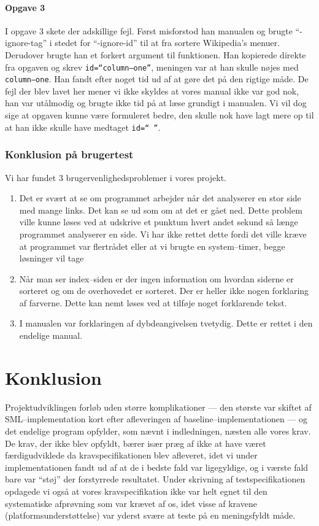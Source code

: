 \documentclass[a4paper,oneside]{memoir}
\begin{document}
\subsubsection{Opgave 3}
I opgave 3 skete der adskillige fejl. Først misforstod han manualen og
brugte ``-ignore-tag'' i stedet for ``-ignore-id'' til at fra sortere
Wikipedia's menuer. Derudover brugte han et forkert argument til
funktionen. Han kopierede direkte fra opgaven og skrev
\texttt{id=``column--one''}, meningen var at han skulle nøjes med
\texttt{column--one}. Han fandt efter noget tid ud af at gøre det på
den rigtige måde. De fejl der blev lavet her mener vi ikke skyldes at
vores manual ikke var god nok, han var utålmodig og brugte ikke tid på
at læse grundigt i manualen. Vi vil dog sige at opgaven kunne være
formuleret bedre, den skulle nok have lagt mere op til at han ikke
skulle have medtaget \texttt{id=`` ''}.

\subsection{Konklusion på brugertest}
Vi har fundet 3 brugervenlighedsproblemer i vores projekt.
\begin{enumerate}
\item Det er svært at se om programmet arbejder når det analyserer en
  stor side med mange links. Det kan se ud som om at det er gået
  ned. Dette problem ville kunne løses ved at udskrive et punktum
  hvert andet sekund så længe programmet analyserer en side. Vi har
  ikke rettet dette fordi det ville kræve at programmet var flertrådet
  eller at vi brugte en system--timer, begge løsninger vil tage
\item Når man ser index--siden er der ingen information om hvordan
  siderne er sorteret og om de overhovedet er sorteret. Der er heller
  ikke nogen forklaring af farverne. Dette kan nemt løses ved at
  tilføje noget forklarende tekst.
\item I manualen var forklaringen af dybdeangivelsen tvetydig. Dette
  er rettet i den endelige manual.
\end{enumerate}

\chapter{Konklusion}
\label{konklusion}

Projektudviklingen forløb uden større komplikationer --- den største
var skiftet af SML--implementation kort efter afleveringen af
baseline--implementationen --- og det endelige program opfylder, som
nævnt i indledningen, næsten alle vores krav. De krav, der ikke blev
opfyldt, bærer især præg af ikke at have været færdigudviklede da
kravspecifikationen blev afleveret, idet vi under implementationen
fandt ud af at de i bedste fald var ligegyldige, og i værste fald bare var
``støj'' der forstyrrede resultatet. Under skrivning af
testspecifikationen opdagede vi også at vores kravspecifikation ikke
var helt egnet til den systematiske afprøvning som var krævet af os,
idet visse af kravene (platformsunderstøttelse) var yderst svære at
teste på en meningsfyldt måde.
\end{document}

